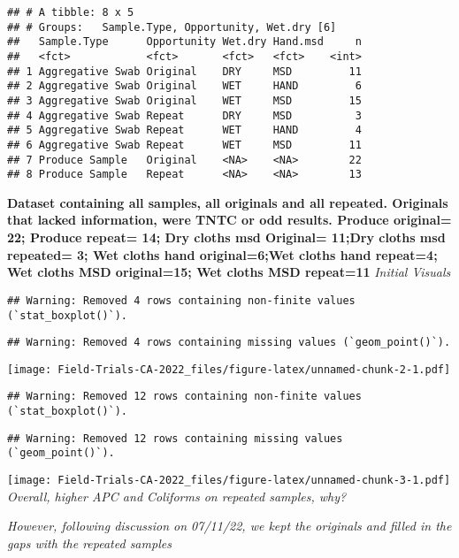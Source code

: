 \documentclass[
]{article}
\begin{document}
\begin{verbatim}
## # A tibble: 8 x 5
## # Groups:   Sample.Type, Opportunity, Wet.dry [6]
##   Sample.Type      Opportunity Wet.dry Hand.msd     n
##   <fct>            <fct>       <fct>   <fct>    <int>
## 1 Aggregative Swab Original    DRY     MSD         11
## 2 Aggregative Swab Original    WET     HAND         6
## 3 Aggregative Swab Original    WET     MSD         15
## 4 Aggregative Swab Repeat      DRY     MSD          3
## 5 Aggregative Swab Repeat      WET     HAND         4
## 6 Aggregative Swab Repeat      WET     MSD         11
## 7 Produce Sample   Original    <NA>    <NA>        22
## 8 Produce Sample   Repeat      <NA>    <NA>        13
\end{verbatim}

\textbf{Dataset containing all samples, all originals and all repeated.
Originals that lacked information, were TNTC or odd results. Produce
original= 22; Produce repeat= 14; Dry cloths msd Original= 11;Dry cloths
msd repeated= 3; Wet cloths hand original=6;Wet cloths hand repeat=4;
Wet cloths MSD original=15; Wet cloths MSD repeat=11} \emph{Initial
Visuals}

\begin{verbatim}
## Warning: Removed 4 rows containing non-finite values (`stat_boxplot()`).
\end{verbatim}

\begin{verbatim}
## Warning: Removed 4 rows containing missing values (`geom_point()`).
\end{verbatim}

\texttt{[image: Field-Trials-CA-2022\_files/figure-latex/unnamed-chunk-2-1.pdf]}

\begin{verbatim}
## Warning: Removed 12 rows containing non-finite values (`stat_boxplot()`).
\end{verbatim}

\begin{verbatim}
## Warning: Removed 12 rows containing missing values (`geom_point()`).
\end{verbatim}

\texttt{[image: Field-Trials-CA-2022\_files/figure-latex/unnamed-chunk-3-1.pdf]}
\emph{Overall, higher APC and Coliforms on repeated samples, why?}

\emph{\emph{However, following discussion on 07/11/22, we kept the
originals and filled in the gaps with the repeated samples}}
\end{document}
